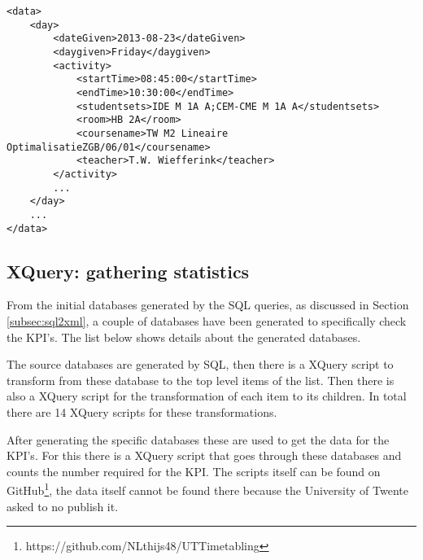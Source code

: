\begin{lstlisting}[caption=XML structure, label=lst:xmlStructure, float=htpb]
<data>
	<day>
		<dateGiven>2013-08-23</dateGiven>
		<daygiven>Friday</daygiven>
		<activity>
			<startTime>08:45:00</startTime>
			<endTime>10:30:00</endTime>
			<studentsets>IDE M 1A A;CEM-CME M 1A A</studentsets>
			<room>HB 2A</room>
			<coursename>TW M2 Lineaire OptimalisatieZGB/06/01</coursename>
			<teacher>T.W. Wiefferink</teacher>
		</activity>
		...
	</day>
	...
</data>
\end{lstlisting}

\subsection{XQuery: gathering statistics} \label{subsec:xquery}
From the initial databases generated by the SQL queries, as discussed in Section \ref{subsec:sql2xml}, a couple of databases have been generated to specifically check the KPI's. The list below shows details about the generated databases. 

The source databases are generated by SQL, then there is a XQuery script to transform from these database to the top level items of the list. Then there is also a XQuery script for the transformation of each item to its children. In total there are 14 XQuery scripts for these transformations.

After generating the specific databases these are used to get the data for the KPI's. For this there is a XQuery script that goes through these databases and counts the number required for the KPI. The scripts itself can be found on GitHub\footnote{https://github.com/NLthijs48/UTTimetabling}, the data itself cannot be found there because the University of Twente asked to no publish it.

